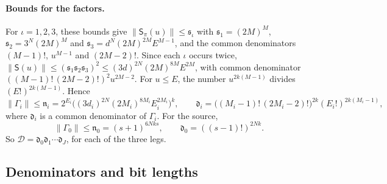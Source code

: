 \paragraph{Bounds for the factors.}
For \(\iota=1,2,3\), these bounds give
\(\|\mathsf S_\pi(u)\|\le\mathfrak s_\iota\) with \(\mathfrak s_1=(2M)^M\),
\(\mathfrak s_2=3^N(2M)^M\) and \(\mathfrak s_3=d^N(2M)^{2M}E^{M-1}\), and
the common denominators \((M-1)!\), \(u^{M-1}\) and \((2M-2)!\). Since
each \(\iota\) occurs twice,
\(\|\mathsf S(u)\|\le(\mathfrak s_1\mathfrak s_2\mathfrak s_3)^2
\le(3d)^{2N}(2M)^{8M}E^{2M}\), with common denominator
\(((M-1)!\,(2M-2)!)^2u^{2M-2}\). For \(u\le E\), the number
\(u^{2k(M-1)}\) divides \((E!)^{2k(M-1)}\). Hence
\begin{equation}\label{eq:coef-stage}
 \|\Gamma_i\|\le\mathfrak n_i=2^{E_i}\bigl((3d_i)^{2N}(2M_i)^{8M_i}
 E_i^{2M_i}\bigr)^k,\qquad
 \mathfrak d_i=\bigl((M_i-1)!\,(2M_i-2)!\bigr)^{2k}(E_i!)^{2k(M_i-1)},
\end{equation}
where \(\mathfrak d_i\) is a common denominator of \(\Gamma_i\). For the
source,
\begin{equation}\label{eq:coef-source}
 \|\Gamma_0\|\le\mathfrak n_0=(s+1)^{6Nks},\qquad
 \mathfrak d_0=((s-1)!)^{2Nk}.
\end{equation}
So \(\mathcal D=\mathfrak d_0\mathfrak d_1\cdots\mathfrak d_J\), for each
of the three legs.

\subsection{Denominators and bit lengths}
\label{sec:coefficients-bounds}

